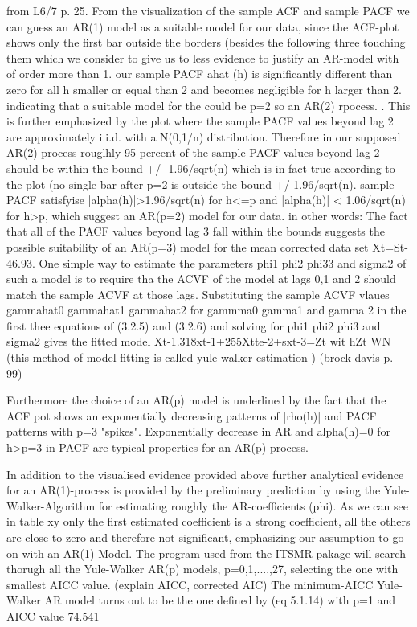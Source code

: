 \documentclass[11pt,a4paper]{article}
\begin{document}
{from L6/7 p. 25. 
From the visualization of the sample ACF and sample PACF we can guess an AR(1) model as a suitable model for our data, since the ACF-plot shows only the first bar outside the borders (besides the following three touching them which we consider to give us to less evidence to justify an AR-model with of order more than 1.
our sample PACF ahat (h) is significantly different than zero for all h smaller or equal than 2 and becomes negligible for h larger than 2. indicating that a suitable model for the could be p=2 so an AR(2) rpocess. . This is further emphasized by the plot where the sample PACF values beyond lag 2 are approximately i.i.d. with a N(0,1/n) distribution. Therefore in our supposed AR(2) process rouglhly 95 percent of the sample PACF values beyond lag 2 should be within the bound +/- 1.96/sqrt(n) which is in fact true according to the plot (no single bar after p=2 is outside the bound +/-1.96/sqrt(n). sample PACF satisfyise |alpha(h)|>1.96/sqrt(n) for h<=p and |alpha(h)| < 1.06/sqrt(n) for h>p, which suggest an AR(p=2) model for our data.
in other words: The fact that all of the PACF values beyond lag 3 fall within the bounds suggests the possible suitability of an AR(p=3) model for the mean corrected data set Xt=St-46.93. One simple way to estimate the parameters phi1 phi2 phi33 and sigma2 of such a model is to require tha the ACVF of the model at lags 0,1 and 2 should match the sample ACVF at those lags. Substituting the sample ACVF vlaues gammahat0 gammahat1 gammahat2 for gammma0 gamma1 and gamma 2 in the first thee equations of (3.2.5) and (3.2.6) and solving for phi1 phi2 phi3 and sigma2 gives the fitted model Xt-1.318xt-1+255Xtte-2+sxt-3=Zt wit hZt  WN (this method of model fitting is called yule-walker estimation ) (brock davis p. 99)

Furthermore the choice of an AR(p) model is underlined by the fact that the ACF pot shows an exponentially decreasing patterns of |rho(h)| and PACF patterns with p=3 "spikes". Exponentially decrease in AR and alpha(h)=0 for h>p=3 in PACF are typical properties for an AR(p)-process.

In addition to the visualised evidence provided above further analytical evidence for an AR(1)-process is provided by the preliminary prediction by using the Yule-Walker-Algorithm for estimating roughly the AR-coefficients (phi). As we can see in table xy only the first estimated coefficient is a strong coefficient, all the others are close to zero and therefore not significant, emphasizing our assumption to go on with an AR(1)-Model.
The program used from the ITSMR pakage will search thorugh all the Yule-Walker AR(p) models, p=0,1,....,27, selecting the one with smallest AICC value. (explain AICC, corrected AIC) The minimum-AICC Yule-Walker AR model turns out to be the one defined by (eq 5.1.14) with p=1 and AICC value 74.541

}
\end{document}
